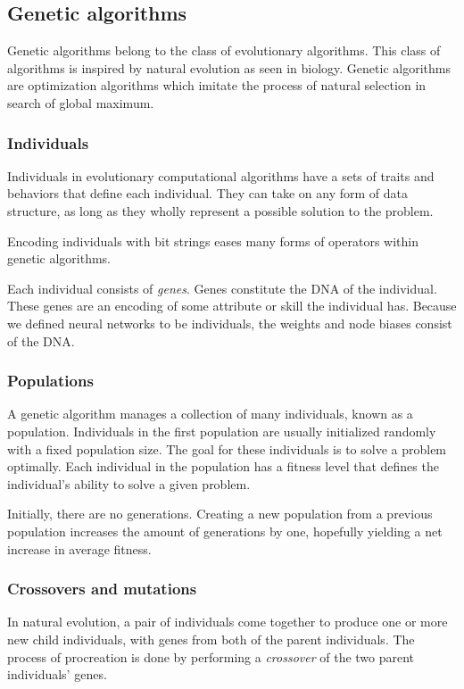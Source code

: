 \subsection{Genetic algorithms}
Genetic algorithms belong to the class of evolutionary algorithms. This class of algorithms is inspired by natural evolution as seen in biology. Genetic algorithms are optimization algorithms which imitate the process of natural selection in search of global maximum.

\subsubsection{Individuals}
Individuals in evolutionary computational algorithms have a sets of traits and behaviors that define each individual. They can take on any form of data structure, as long as they wholly represent a possible solution to the problem. 

Encoding individuals with bit strings eases many forms of operators within genetic algorithms.

Each individual consists of \emph{genes}. Genes constitute the DNA of the individual. These genes are an encoding of some attribute or skill the individual has. Because we defined neural networks to be individuals, the weights and node biases consist of the DNA.

\subsubsection{Populations}
A genetic algorithm manages a collection of many individuals, known as a population. Individuals in the first population are usually initialized randomly with a fixed population size. The goal for these individuals is to solve a problem optimally. Each individual in the population has a fitness level that defines the individual's ability to solve a given problem.

Initially, there are no generations. Creating a new population from a previous population increases the amount of generations by one, hopefully yielding a net increase in average fitness.

\subsubsection{Crossovers and mutations}
In natural evolution, a pair of individuals come together to produce one or more new child individuals, with genes from both of the parent individuals. The process of procreation is done by performing a \emph{crossover} of the two parent individuals' genes.

